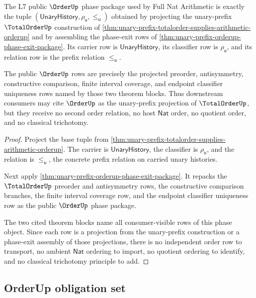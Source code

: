 \begin{theorem}
\label{thm:orderup-totalorder-alias-boundary}
The L7 public $\OrderUp$ phase package used by Full Nat Arithmetic is exactly
the tuple
$(\mathsf{UnaryHistory},\rho_{\mathsf{u}},\le_{\mathsf{u}})$ obtained by
projecting the unary-prefix $\TotalOrderUp$ construction of
\autoref{thm:unary-prefix-totalorder-supplies-arithmetic-orderup} and by
assembling the phase-exit rows of
\autoref{thm:unary-prefix-orderup-phase-exit-package}. Its carrier row is
$\mathsf{UnaryHistory}$, its classifier row is $\rho_{\mathsf{u}}$, and its
relation row is the prefix relation $\le_{\mathsf{u}}$.

The public $\OrderUp$ rows are precisely the projected preorder,
antisymmetry, constructive comparison, finite interval coverage, and endpoint
classifier uniqueness rows named by those two theorem blocks. Thus downstream
consumers may cite $\OrderUp$ as the unary-prefix projection of
$\TotalOrderUp$, but they receive no second order relation, no host
$\mathsf{Nat}$ order, no quotient order, and no classical trichotomy.
\end{theorem}
\begin{proof}
Project the base tuple from
\autoref{thm:unary-prefix-totalorder-supplies-arithmetic-orderup}. The carrier
is $\mathsf{UnaryHistory}$, the classifier is $\rho_{\mathsf{u}}$, and the
relation is $\le_{\mathsf{u}}$, the concrete prefix relation on carried unary
histories.

Next apply \autoref{thm:unary-prefix-orderup-phase-exit-package}. It repacks
the $\TotalOrderUp$ preorder and antisymmetry rows, the constructive
comparison branches, the finite interval coverage row, and the endpoint
classifier uniqueness row as the public $\OrderUp$ phase package.

The two cited theorem blocks name all consumer-visible rows of this phase
object. Since each row is a projection from the unary-prefix construction or a
phase-exit assembly of those projections, there is no independent order row to
transport, no ambient $\mathsf{Nat}$ ordering to import, no quotient ordering
to identify, and no classical trichotomy principle to add.
\end{proof}

\subsection{OrderUp obligation set}
\label{sec:totalorder-orderup-obligation-set}

